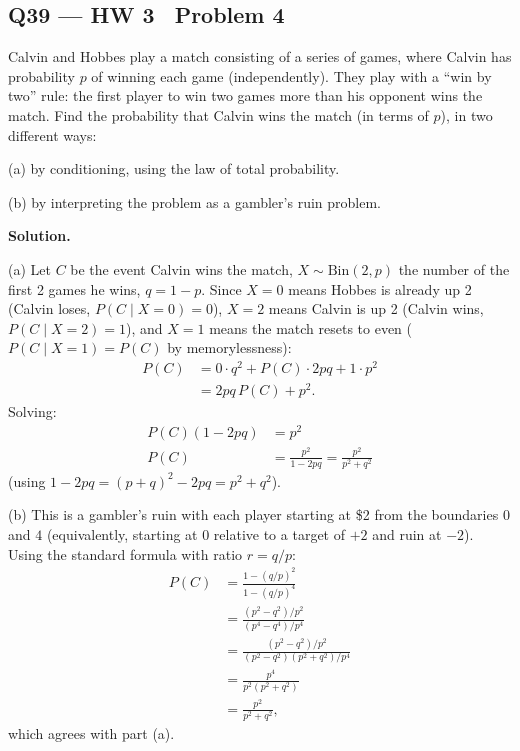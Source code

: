 \documentclass[11pt]{article}
\begin{document}
\subsection*{Q39 --- HW 3 \textperiodcentered\ Problem 4}
\begin{qbox}
Calvin and Hobbes play a match consisting of a series of games, where Calvin has probability $p$ of winning each game (independently). They play with a ``win by two'' rule: the first player to win two games more than his opponent wins the match. Find the probability that Calvin wins the match (in terms of $p$), in two different ways:

(a) by conditioning, using the law of total probability.

(b) by interpreting the problem as a gambler's ruin problem.
\end{qbox}
\textbf{Solution.}

(a) Let $C$ be the event Calvin wins the match, $X\sim\text{Bin}(2,p)$ the number of the first 2 games he wins, $q=1-p$. Since $X=0$ means Hobbes is already up 2 (Calvin loses, $P(C\mid X=0)=0$), $X=2$ means Calvin is up 2 (Calvin wins, $P(C\mid X=2)=1$), and $X=1$ means the match resets to even ($P(C\mid X=1)=P(C)$ by memorylessness):
\begin{align*}
P(C) &= 0\cdot q^2 + P(C)\cdot 2pq + 1\cdot p^2 \\
&= 2pq\,P(C)+p^2.
\end{align*}
Solving:
\begin{align*}
P(C)(1-2pq) &= p^2 \\
P(C) &= \frac{p^2}{1-2pq} = \frac{p^2}{p^2+q^2}
\end{align*}
(using $1-2pq = (p+q)^2-2pq = p^2+q^2$).

(b) This is a gambler's ruin with each player starting at \$2 from the boundaries $0$ and $4$ (equivalently, starting at 0 relative to a target of $+2$ and ruin at $-2$). Using the standard formula with ratio $r=q/p$:
\begin{align*}
P(C) &= \frac{1-(q/p)^2}{1-(q/p)^4} \\
&= \frac{(p^2-q^2)/p^2}{(p^4-q^4)/p^4} \\
&= \frac{(p^2-q^2)/p^2}{(p^2-q^2)(p^2+q^2)/p^4} \\
&= \frac{p^4}{p^2(p^2+q^2)} \\
&= \frac{p^2}{p^2+q^2},
\end{align*}
which agrees with part (a).
\end{document}
